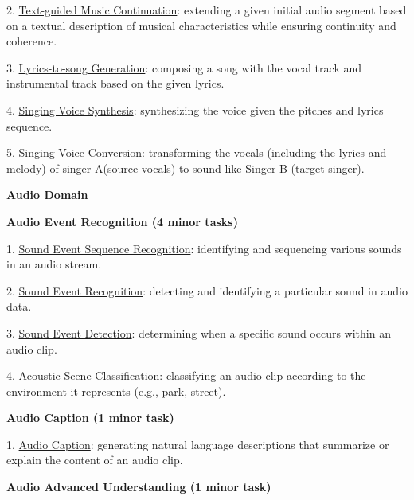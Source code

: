 2. \underline{Text-guided Music Continuation}: extending a given initial audio segment based on a textual description of musical characteristics while ensuring continuity and coherence.
		
3. \underline{Lyrics-to-song Generation}: composing a song with the vocal track and instrumental track based on the given lyrics.

4. \underline{Singing Voice Synthesis}: synthesizing the voice given the pitches and lyrics sequence.

5. \underline{Singing Voice Conversion}: transforming the vocals (including the lyrics and melody) of singer A(source vocals) to sound like Singer B (target singer).

\vspace{10pt}
\begin{center}
\textbf{Audio Domain}
\end{center}

\textbf{Audio Event Recognition (4 minor tasks)}

1. \underline{Sound Event Sequence Recognition}: identifying and sequencing various sounds in an audio stream.

2. \underline{Sound Event Recognition}: detecting and identifying a particular sound in audio data.

3. \underline{Sound Event Detection}: determining when a specific sound occurs within an audio clip.

4. \underline{Acoustic Scene Classification}: classifying an audio clip according to the environment it represents (e.g., park, street).




\textbf{Audio Caption (1 minor task)}

1. \underline{Audio Caption}: generating natural language descriptions that summarize or explain the content of an audio clip.



\textbf{Audio Advanced Understanding (1 minor task)}

